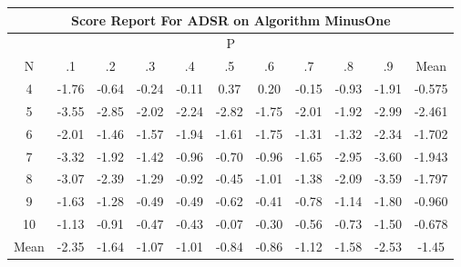 \documentclass[11pt,a4paper]{report}
\begin{document}
\begin{longtable}{ | c || c | c | c | c | c | c | c | c | c || c |}
\hline
\multicolumn{11}{|c|}{ Score Report For ADSR on Algorithm MinusOne} \\
\hline
\multicolumn{11}{|c|}{ P } \\
\hline
N & .1 & .2 & .3 & .4 & .5 & .6 & .7 & .8 & .9 & Mean\\
 \hline
 \hline
 \endhead
  4 &  \cellcolor[HTML]{FFCFCF} -1.76 &  \cellcolor[HTML]{FFEFEF} -0.64 &  \cellcolor[HTML]{FFF7F7} -0.24 &  \cellcolor[HTML]{FFFFFF} -0.11 &  \cellcolor[HTML]{F7F7FF} 0.37 &  \cellcolor[HTML]{F7F7FF} 0.20 &  \cellcolor[HTML]{FFFFFF} -0.15 &  \cellcolor[HTML]{FFE7E7} -0.93 &  \cellcolor[HTML]{FFCFCF} -1.91 & -0.575 \\
  5 &  \cellcolor[HTML]{FFA7A7} -3.55 &  \cellcolor[HTML]{FFB7B7} -2.85 &  \cellcolor[HTML]{FFCFCF} -2.02 &  \cellcolor[HTML]{FFC7C7} -2.24 &  \cellcolor[HTML]{FFB7B7} -2.82 &  \cellcolor[HTML]{FFCFCF} -1.75 &  \cellcolor[HTML]{FFCFCF} -2.01 &  \cellcolor[HTML]{FFCFCF} -1.92 &  \cellcolor[HTML]{FFB7B7} -2.99 & -2.461 \\
  6 &  \cellcolor[HTML]{FFCFCF} -2.01 &  \cellcolor[HTML]{FFD7D7} -1.46 &  \cellcolor[HTML]{FFD7D7} -1.57 &  \cellcolor[HTML]{FFCFCF} -1.94 &  \cellcolor[HTML]{FFD7D7} -1.61 &  \cellcolor[HTML]{FFCFCF} -1.75 &  \cellcolor[HTML]{FFDFDF} -1.31 &  \cellcolor[HTML]{FFDFDF} -1.32 &  \cellcolor[HTML]{FFC7C7} -2.34 & -1.702 \\
  7 &  \cellcolor[HTML]{FFAFAF} -3.32 &  \cellcolor[HTML]{FFCFCF} -1.92 &  \cellcolor[HTML]{FFDFDF} -1.42 &  \cellcolor[HTML]{FFE7E7} -0.96 &  \cellcolor[HTML]{FFEFEF} -0.70 &  \cellcolor[HTML]{FFE7E7} -0.96 &  \cellcolor[HTML]{FFD7D7} -1.65 &  \cellcolor[HTML]{FFB7B7} -2.95 &  \cellcolor[HTML]{FFA7A7} -3.60 & -1.943 \\
  8 &  \cellcolor[HTML]{FFAFAF} -3.07 &  \cellcolor[HTML]{FFBFBF} -2.39 &  \cellcolor[HTML]{FFDFDF} -1.29 &  \cellcolor[HTML]{FFE7E7} -0.92 &  \cellcolor[HTML]{FFF7F7} -0.45 &  \cellcolor[HTML]{FFE7E7} -1.01 &  \cellcolor[HTML]{FFDFDF} -1.38 &  \cellcolor[HTML]{FFC7C7} -2.09 &  \cellcolor[HTML]{FFA7A7} -3.59 & -1.797 \\
  9 &  \cellcolor[HTML]{FFD7D7} -1.63 &  \cellcolor[HTML]{FFDFDF} -1.28 &  \cellcolor[HTML]{FFEFEF} -0.49 &  \cellcolor[HTML]{FFEFEF} -0.49 &  \cellcolor[HTML]{FFEFEF} -0.62 &  \cellcolor[HTML]{FFF7F7} -0.41 &  \cellcolor[HTML]{FFEFEF} -0.78 &  \cellcolor[HTML]{FFDFDF} -1.14 &  \cellcolor[HTML]{FFCFCF} -1.80 & -0.960 \\
  10 &  \cellcolor[HTML]{FFDFDF} -1.13 &  \cellcolor[HTML]{FFE7E7} -0.91 &  \cellcolor[HTML]{FFF7F7} -0.47 &  \cellcolor[HTML]{FFF7F7} -0.43 &  \cellcolor[HTML]{FFFFFF} -0.07 &  \cellcolor[HTML]{FFF7F7} -0.30 &  \cellcolor[HTML]{FFEFEF} -0.56 &  \cellcolor[HTML]{FFEFEF} -0.73 &  \cellcolor[HTML]{FFD7D7} -1.50 & -0.678 \\
 \hline
 \hline
Mean &  \cellcolor[HTML]{FFC7C7} -2.35 &  \cellcolor[HTML]{FFD7D7} -1.64 &  \cellcolor[HTML]{FFE7E7} -1.07 &  \cellcolor[HTML]{FFE7E7} -1.01 &  \cellcolor[HTML]{FFE7E7} -0.84 &  \cellcolor[HTML]{FFE7E7} -0.86 &  \cellcolor[HTML]{FFDFDF} -1.12 &  \cellcolor[HTML]{FFD7D7} -1.58 &  \cellcolor[HTML]{FFBFBF} -2.53 &  \cellcolor[HTML]{FFD7D7} -1.45
\end{longtable}
\end{document}
